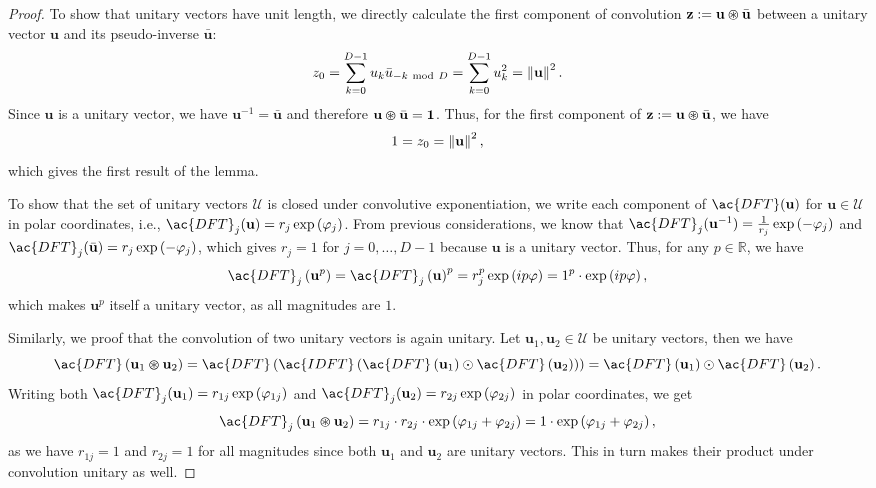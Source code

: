 \begin{proof}
	To show that unitary vectors have unit length, we directly calculate the first component of convolution $ \mathbf{z} := \mathbf{u} \varoast \bar{ \mathbf{u}}$ between a unitary vector $ \mathbf{u}$ and its pseudo-inverse $\bar{ \mathbf{u}}$:
	\[
	z_{0} = \sum_{k=0}^{D-1} u_{k} \bar{u}_{-k \ \mathrm{mod}\ D} = \sum_{k=0}^{D-1} u_{k}^{2} = \left\|  \mathbf{u} \right\|^{2}.
	\]
	Since $ \mathbf{u}$ is a unitary vector, we have $ \mathbf{u}^{-1} = \bar{ \mathbf{u}}$ and therefore $ \mathbf{u}\varoast \bar{ \mathbf{u}} = \mathbf{1}$.
	Thus, for the first component of $ \mathbf{z} := \mathbf{u} \varoast \bar{ \mathbf{u}}$, we have 
	\[
	1 = z_{0} = \left\|  \mathbf{u} \right\|^{2},
	\]
	which gives the first result of the lemma.
    
	To show that the set of unitary vectors $\mathcal{U}$ is closed under convolutive exponentiation, we write each component of $\ac{DFT}( \mathbf{u})$ for $ \mathbf{u} \in \mathcal{U}$ in polar coordinates, i.e., $\ac{DFT}_j( \mathbf{u}) = r_j\exp\left(\varphi_j\right)$.
	From previous considerations, we know that $\ac{DFT}_j( \mathbf{u}^{-1}) = \frac{1}{r_j}\exp\left(-\varphi_j\right)$ and $\ac{DFT}_j(\bar{ \mathbf{u}}) = r_j\exp\left(-\varphi_j\right)$, which gives $r_j=1$ for $j=0, \ldots, D-1$ because $ \mathbf{u}$ is a unitary vector.
	Thus, for any $p \in \mathbb{R}$, we have 
	\[
	\ac{DFT}_j\left( \mathbf{u}^{p}\right) = \ac{DFT}_j\left( \mathbf{u}\right)^{p} = r_j^{p}\exp\left(ip\varphi\right) = 1^{p} \cdot \exp\left(ip\varphi\right),
	\]
	which makes $ \mathbf{u}^{p}$ itself a unitary vector, as all magnitudes are $1$.	

    Similarly, we proof that the convolution of two unitary vectors is again unitary. 
    Let $ \mathbf{u}_{1}, \mathbf{u}_{2} \in \mathcal{U}$ be unitary vectors, then we have
    \[
        \ac{DFT} \left( \mathbf{u}_1 \varoast \mathbf{u}_2\right) = \ac{DFT} \left( \ac{IDFT} \left( \ac{DFT} \left( \mathbf{u}_1\right) \odot \ac{DFT} \left( \mathbf{u}_2\right)\right)\right) =  \ac{DFT} \left( \mathbf{u}_1\right) \odot \ac{DFT} \left( \mathbf{u}_2\right).
    \]
    Writing both $\ac{DFT}_j( \mathbf{u}_1) = r_{1j}\exp\left(\varphi_{1j}\right)$ and $\ac{DFT}_j( \mathbf{u}_2) = r_{2j}\exp\left(\varphi_{2j}\right)$ in polar coordinates, we get 
    \[
        \ac{DFT}_j \left( \mathbf{u}_1 \varoast \mathbf{u}_2\right) = r_{1j} \cdot r_{2j} \cdot \exp \left(\varphi_{1j} + \varphi_{2j}\right) = 1 \cdot \exp \left(\varphi_{1j} + \varphi_{2j}\right),
    \]
    as we have $r_{1j}=1$ and $r_{2j}=1$ for all magnitudes since both $ \mathbf{u}_1$ and $ \mathbf{u}_2$ are unitary vectors.
    This in turn makes their product under convolution unitary as well.
    

\end{proof}
